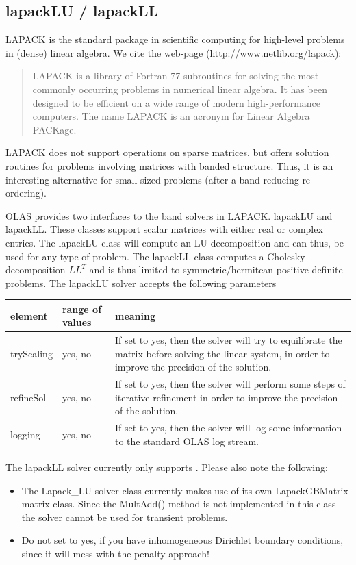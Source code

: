 \subsection{lapackLU / lapackLL}
%
%
LAPACK is the standard package in scientific computing for high-level problems
in (dense) linear algebra. We cite the web-page
(\url{http://www.netlib.org/lapack}):
%
%
\begin{quote}
LAPACK is a library of Fortran 77 subroutines for solving the most commonly
occurring problems in numerical linear algebra. It has been designed to be
efficient on a wide range of modern high-performance computers. The name LAPACK
is an acronym for Linear Algebra PACKage.
\end{quote}
%
%
LAPACK does not support operations on sparse matrices, but offers solution
routines for problems involving matrices with banded structure. Thus, it is
an interesting alternative for small sized problems (after a band reducing
re-ordering).

OLAS provides two interfaces to the band solvers in LAPACK. lapackLU and
lapackLL. These classes support scalar matrices with either real or complex
entries. The lapackLU class will compute an LU decomposition and can thus, be
used for any type of problem. The lapackLL class computes a Cholesky
decomposition $LL^T$ and is thus limited to symmetric/hermitean positive
definite problems. The lapackLU solver accepts the following parameters
%
%
\begin{center}
\begin{tabular}{llp{}}
\toprule
element & range of values & meaning \\
\midrule
tryScaling & yes, no & If set to yes, then the solver will try to equilibrate
                       the matrix before solving the linear system, in order
                       to improve the precision of the solution.\\
\midrule
refineSol  & yes, no & If set to yes, then the solver will perform some steps
                       of iterative refinement in order to improve the
                       precision of the solution.\\
\midrule
logging    & yes, no & If set to yes, then the solver will log some information
                       to the standard OLAS log stream.\\
\bottomrule
\end{tabular}
\end{center}
%
%
The lapackLL solver currently only supports . Please also
note
the following:
%
%
\begin{itemize}
\item The Lapack\_LU solver class currently makes use of its own LapackGBMatrix
      matrix class. Since the MultAdd() method is not implemented in this class
      the solver cannot be used for transient problems.
\item Do not set  to yes, if you have inhomogeneous
Dirichlet
      boundary conditions, since it will mess with the penalty approach!
\end{itemize}
%
%
